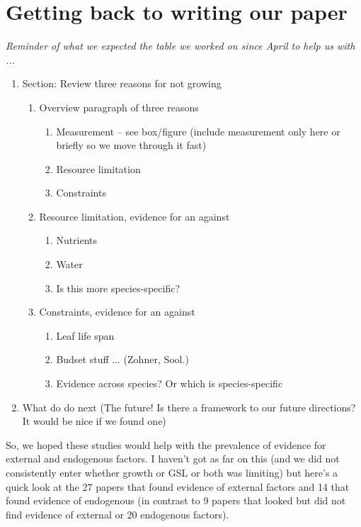 \documentclass[11pt]{article}
\begin{document}
\section{Getting back to writing our paper}

\emph{Reminder of what we expected the table we worked on since April to help us with ...}
\begin{enumerate}
\item Section: Review three reasons for not growing 
\begin{enumerate} 
\item Overview paragraph of three reasons
\begin{enumerate} 
\item Measurement -- see box/figure  (include measurement only here or briefly so we move through it fast)
\item Resource limitation
\item Constraints
\end{enumerate}
\item Resource limitation, evidence for an against 
\begin{enumerate}
\item Nutrients
\item Water
\item Is this more species-specific?
\end{enumerate}
\item Constraints, evidence for an against 
\begin{enumerate}
\item Leaf life span
\item Budset stuff ... (Zohner, Sool.)
\item Evidence across species? Or which is species-specific
\end{enumerate}
\end{enumerate}
\item What do do next (The future! Is there a framework to our future directions? It would be nice if we found one) 
\end{enumerate}

\vspace{5ex}
So, we hoped these studies would help with the prevalence of evidence for external and endogenous factors. I haven't got as far on this (and we did not consistently enter whether growth or GSL or both was limiting) but here's a quick look at the 27 papers that found evidence of external factors and 14 that found evidence of endogenous (in contrast to 9 papers that looked but did not find evidence of external or 20 endogenous factors).
\end{document}
